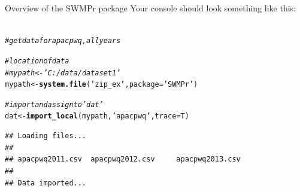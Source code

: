 \documentclass[xcolor=svgnames]{beamer}\usepackage[]{graphicx}\usepackage[]{color}
\makeatletter
\newcommand{\hlstr}[1]{\textcolor[rgb]{0.192,0.494,0.8}{#1}}%
\newcommand{\hlcom}[1]{\textcolor[rgb]{0.678,0.584,0.686}{\textit{#1}}}%
\newcommand{\hlstd}[1]{\textcolor[rgb]{0.345,0.345,0.345}{#1}}%
\newcommand{\hlkwb}[1]{\textcolor[rgb]{0.69,0.353,0.396}{#1}}%
\newcommand{\hlkwc}[1]{\textcolor[rgb]{0.333,0.667,0.333}{#1}}%
\newcommand{\hlkwd}[1]{\textcolor[rgb]{0.737,0.353,0.396}{\textbf{#1}}}%
\newenvironment{kframe}{%
 \def\at@end@of@kframe{}%
 \ifinner\ifhmode%
  \def\at@end@of@kframe{\end{minipage}}%
  \begin{minipage}{\columnwidth}%
 \fi\fi%
 \def\FrameCommand##1{\hskip\@totalleftmargin \hskip-\fboxsep
 \colorbox{shadecolor}{##1}\hskip-\fboxsep
     \hskip-\linewidth \hskip-\@totalleftmargin \hskip\columnwidth}%
 \MakeFramed {\advance\hsize-\width
   \@totalleftmargin\z@ \linewidth\hsize
   \@setminipage}}%
 {\par\unskip\endMakeFramed%
 \at@end@of@kframe}
\newenvironment{knitrout}{}{} %
\makeatother
\begin{document}
\begin{frame}[fragile]{Overview of the SWMPr package}
Your console should look something like this:\\~\\
\begin{knitrout}\scriptsize
{}\color{fgcolor}\begin{kframe}
\begin{alltt}
\hlcom{# get data for apacpwq, all years}

\hlcom{# location of data}
\hlcom{# mypath <- 'C:/data/dataset1'}
\hlstd{mypath} \hlkwb{<-} \hlkwd{system.file}\hlstd{(}\hlstr{'zip_ex'}\hlstd{,} \hlkwc{package} \hlstd{=} \hlstr{'SWMPr'}\hlstd{)}

\hlcom{# import and assign to 'dat'}
\hlstd{dat} \hlkwb{<-} \hlkwd{import_local}\hlstd{(mypath,} \hlstr{'apacpwq'}\hlstd{,} \hlkwc{trace} \hlstd{= T)}
\end{alltt}
\begin{verbatim}
## Loading files...
## 
## apacpwq2011.csv 	apacpwq2012.csv 	apacpwq2013.csv 	
## 
## Data imported...
\end{verbatim}
\end{kframe}
\end{knitrout}
\end{frame}
\end{document}
